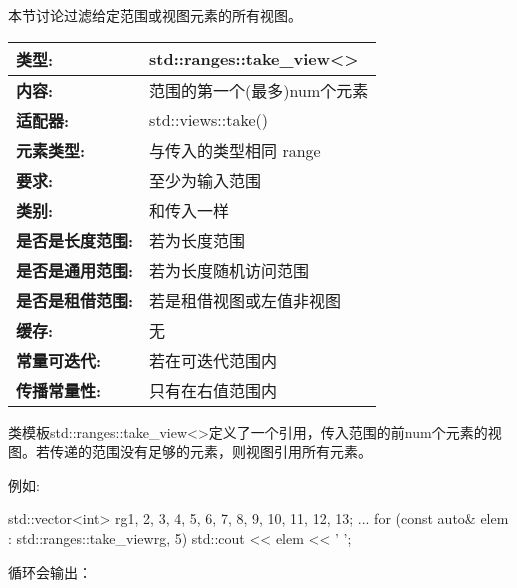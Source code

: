 

本节讨论过滤给定范围或视图元素的所有视图。



\begin{longtable}[c]{|l|l|}
\hline
\textbf{类型:}                 & std::ranges::take\_view\textless{}\textgreater{} \\ \hline
\endfirsthead
%
\endhead
%
\textbf{内容:}              & 范围的第一个(最多)num个元素        \\ \hline
\textbf{适配器:}              & std::views::take()                               \\ \hline
\textbf{元素类型:}         & 与传入的类型相同 range                        \\ \hline
\textbf{要求:}             & 至少为输入范围                             \\ \hline
\textbf{类别:}             & 和传入一样                                   \\ \hline
\textbf{是否是长度范围:}       & 若为长度范围                              \\ \hline
\textbf{是否是通用范围:}      &若为长度随机访问范围                  \\ \hline
\textbf{是否是租借范围:}    & 若是租借视图或左值非视图        \\ \hline
\textbf{缓存:}               & 无                                          \\ \hline
\textbf{常量可迭代:}       & 若在可迭代范围内                       \\ \hline
\textbf{传播常量性:} & 只有在右值范围内                          \\ \hline
\end{longtable}

类模板std::ranges::take\_view<>定义了一个引用，传入范围的前num个元素的视图。若传递的范围没有足够的元素，则视图引用所有元素。

例如:

\begin{cpp}
std::vector<int> rg{1, 2, 3, 4, 5, 6, 7, 8, 9, 10, 11, 12, 13};
...
for (const auto& elem : std::ranges::take_view{rg, 5}) {
	std::cout << elem << ' ';
}
\end{cpp}

循环会输出：

